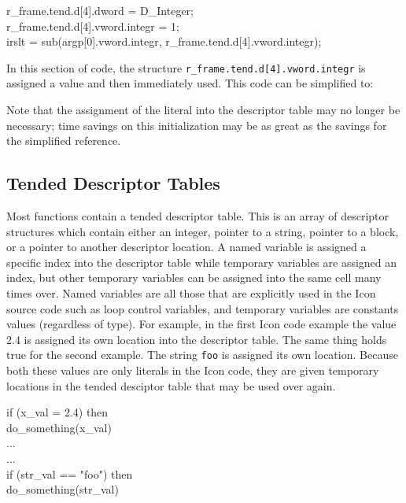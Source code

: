 \begin{iconcode}
r\_frame.tend.d[4].dword = D\_Integer;\\
r\_frame.tend.d[4].vword.integr = 1;\\
irslt = sub(argp[0].vword.integr, r\_frame.tend.d[4].vword.integr);
\end{iconcode}

In this section of code, the structure
\texttt{r\_frame.tend.d[4].vword.integr} is assigned a value and then
immediately used. This code can be simplified to:



Note that the assignment of the literal into the descriptor table may
no longer be necessary; time savings on this initialization may be as
great as the savings for the simplified reference.


\subsection{Tended Descriptor Tables}

Most functions contain a tended descriptor table. This is an array of
descriptor structures which contain either an integer, pointer to a
string, pointer to a block, or a pointer to another descriptor
location. A named variable is assigned a specific index into the
descriptor table while temporary variables are assigned an index, but
other temporary variables can be assigned into the same cell many
times over. Named variables are all those that are explicitly used in
the Icon source code such as loop control variables, and temporary
variables are constants values (regardless of type). For example, in
the first Icon code example the value 2.4 is assigned its own location
into the descriptor table. The same thing holds true for the second
example. The string \texttt{{\textquotedbl}foo{\textquotedbl}} is
assigned its own location. Because both these values are only literals
in the Icon code, they are given temporary locations in the tended
desciptor table that may be used over again.

\begin{iconcode}
\>   if (x\_val = 2.4) then \\
\> \>   do\_something(x\_val) \\
\>   ... \\
\>   ... \\
\>   if (str\_val == "foo") then \\
\> \>   do\_something(str\_val)
\end{iconcode}


